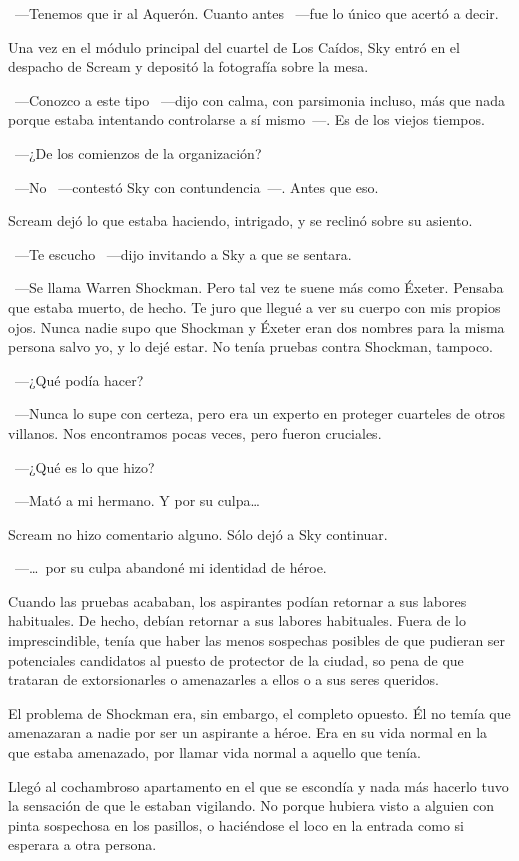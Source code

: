 ~---Tenemos que ir al Aquerón. Cuanto antes ~---fue lo único que acertó a decir.

Una vez en el módulo principal del cuartel de Los Caídos, Sky entró en el despacho de Scream y depositó la fotografía sobre la mesa.

~---Conozco a este tipo ~---dijo con calma, con parsimonia incluso, más que nada porque estaba intentando controlarse a sí mismo~---. Es de los viejos tiempos.

~---¿De los comienzos de la organización?

~---No ~---contestó Sky con contundencia~---. Antes que eso.

Scream dejó lo que estaba haciendo, intrigado, y se reclinó sobre su asiento.

~---Te escucho ~---dijo invitando a Sky a que se sentara.

~---Se llama Warren Shockman. Pero tal vez te suene más como Éxeter. Pensaba que estaba muerto, de hecho. Te juro que llegué a ver su cuerpo con mis propios ojos. Nunca nadie supo que Shockman y Éxeter eran dos nombres para la misma persona salvo yo, y lo dejé estar. No tenía pruebas contra Shockman, tampoco.

~---¿Qué podía hacer?

~---Nunca lo supe con certeza, pero era un experto en proteger cuarteles de otros villanos. Nos encontramos pocas veces, pero fueron cruciales.

~---¿Qué es lo que hizo?

~---Mató a mi hermano. Y por su culpa\dots

Scream no hizo comentario alguno. Sólo dejó a Sky continuar.

~---\dots\ por su culpa abandoné mi identidad de héroe.

\parbreak
Cuando las pruebas acababan, los aspirantes podían retornar a sus labores habituales. De hecho, debían retornar a sus labores habituales. Fuera de lo imprescindible, tenía que haber las menos sospechas posibles de que pudieran ser potenciales candidatos al puesto de protector de la ciudad, so pena de que trataran de extorsionarles o amenazarles a ellos o a sus seres queridos.

El problema de Shockman era, sin embargo, el completo opuesto. Él no temía que amenazaran a nadie por ser un aspirante a héroe. Era en su vida normal en la que estaba amenazado, por llamar vida normal a aquello que tenía.

Llegó al cochambroso apartamento en el que se escondía y nada más hacerlo tuvo la sensación de que le estaban vigilando. No porque hubiera visto a alguien con pinta sospechosa en los pasillos, o haciéndose el loco en la entrada como si esperara a otra persona.

